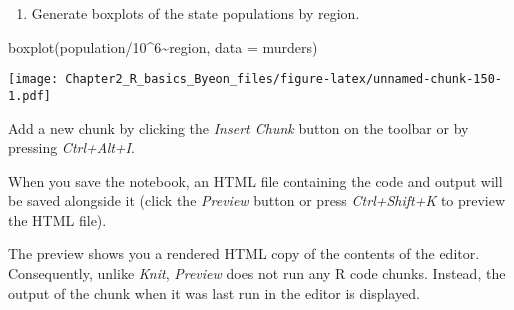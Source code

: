 \documentclass[
]{article}
\newenvironment{Shaded}{\begin{snugshade}}{\end{snugshade}}
\newcommand{\AttributeTok}[1]{\textcolor[rgb]{0.77,0.63,0.00}{#1}}
\newcommand{\DecValTok}[1]{\textcolor[rgb]{0.00,0.00,0.81}{#1}}
\newcommand{\FunctionTok}[1]{\textcolor[rgb]{0.00,0.00,0.00}{#1}}
\newcommand{\NormalTok}[1]{#1}
\newcommand{\SpecialCharTok}[1]{\textcolor[rgb]{0.00,0.00,0.00}{#1}}
\providecommand{\tightlist}{%
  \setlength{\itemsep}{0pt}\setlength{\parskip}{0pt}}
\begin{document}
\begin{enumerate}
\def\labelenumi{\arabic{enumi}.}
\setcounter{enumi}{2}
\tightlist
\item
  Generate boxplots of the state populations by region.
\end{enumerate}

\begin{Shaded}
\begin{Highlighting}[]
\FunctionTok{boxplot}\NormalTok{(population}\SpecialCharTok{/}\DecValTok{10}\SpecialCharTok{\^{}}\DecValTok{6}\SpecialCharTok{\textasciitilde{}}\NormalTok{region, }\AttributeTok{data =}\NormalTok{ murders)}
\end{Highlighting}
\end{Shaded}

\texttt{[image: Chapter2\_R\_basics\_Byeon\_files/figure-latex/unnamed-chunk-150-1.pdf]}

Add a new chunk by clicking the \emph{Insert Chunk} button on the
toolbar or by pressing \emph{Ctrl+Alt+I}.

When you save the notebook, an HTML file containing the code and output
will be saved alongside it (click the \emph{Preview} button or press
\emph{Ctrl+Shift+K} to preview the HTML file).

The preview shows you a rendered HTML copy of the contents of the
editor. Consequently, unlike \emph{Knit}, \emph{Preview} does not run
any R code chunks. Instead, the output of the chunk when it was last run
in the editor is displayed.
\end{document}
